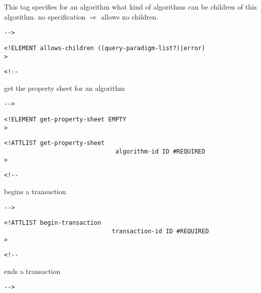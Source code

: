      This tag specifies for an algorithm what kind of algorithms
     can be children of this algorithm. no specification $\Rightarrow$ allows no
     children.

       
 \begin{verbatim}-->\end{verbatim}



\begin{verbatim}
<!ELEMENT allows-children ((query-paradigm-list?)|error) 
>\end{verbatim}

\begin{verbatim}<!--\end{verbatim}
   

     get the property sheet for an algorithm

       
 \begin{verbatim}-->\end{verbatim}



\begin{verbatim}
<!ELEMENT get-property-sheet EMPTY 
>\end{verbatim}

\begin{verbatim}
<!ATTLIST get-property-sheet 
                               algorithm-id ID #REQUIRED
>\end{verbatim}

\begin{verbatim}<!--\end{verbatim}
   

     begins a transaction 

       
 \begin{verbatim}-->\end{verbatim}



\begin{verbatim}
<!ATTLIST begin-transaction 
                              transaction-id ID #REQUIRED
>\end{verbatim}

\begin{verbatim}<!--\end{verbatim}
   

     ends a transaction 

       
 \begin{verbatim}-->\end{verbatim}



